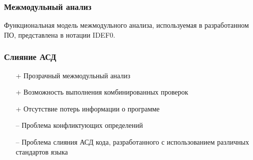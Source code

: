 \documentclass[hyperref={pdfpagelabels=false}]{beamer}
\begin{document}

\begin{frame}
\frametitle{Межмодульный анализ}
Функциональная модель межмодульного анализа, используемая в разработанном ПО, представлена в нотации IDEF0.
\begin{figure}[h]
\end{figure}
\end{frame}

\begin{frame}
\frametitle{Слияние АСД}
\begin{itemize}
 \item[+] Прозрачный межмодульный анализ
 \item[+] Возможность выполнения комбинированных проверок
 \item[+] Отсутствие потерь информации о программе
 \item[--] Проблема конфликтующих определений
 \item[--] Проблема слияния АСД кода, разработанного с использованием различных стандартов языка
\end{itemize}
\end{frame}

\end{document}
